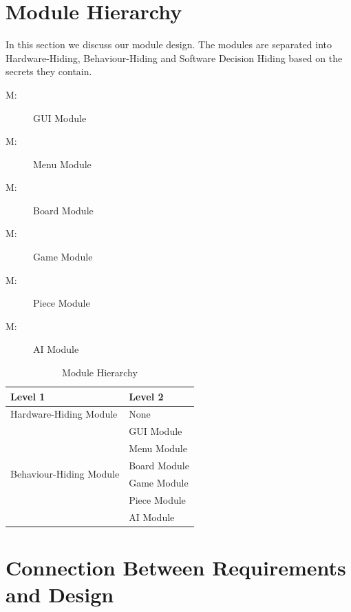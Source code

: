 \documentclass[12pt, titlepage]{article}
\newcounter{mnum}
\newcommand{\mthemnum}{M\themnum}
\begin{document}
\section{Module Hierarchy} \label{SecMH}

In this section we discuss our module design. The modules are separated into Hardware-Hiding, Behaviour-Hiding and Software Decision Hiding based on the secrets they contain. 

\begin{description}
\item [ \mthemnum \label{mGUI}:] GUI Module
\item [ \mthemnum \label{mM}:] Menu Module
\item [ \mthemnum \label{mB}:] Board Module
\item [ \mthemnum \label{mG}:] Game Module
\item [ \mthemnum \label{mP}:] Piece Module
\item [ \mthemnum \label{mA}:] AI Module
\end{description}


\begin{table}[h!]
\centering
\begin{tabular}{p{} p{}}
\toprule
\textbf{Level 1} & \textbf{Level 2}\\
\midrule

{Hardware-Hiding Module} & None \\
\midrule

\multirow{7}{0.3\textwidth}{Behaviour-Hiding Module} & GUI Module\\
& Menu Module\\
& Board Module\\
& Game Module\\
& Piece Module\\
\midrule

\multirow{1}{0.3\textwidth}{Software Decision Module} & AI Module\\
\bottomrule

\end{tabular}
\caption{Module Hierarchy}
\label{TblMH}
\end{table}

\section{Connection Between Requirements and Design} \label{SecConnection}
\end{document}
